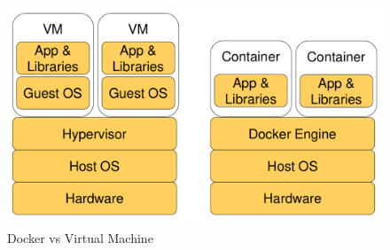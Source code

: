 \documentclass[twoside,english,brazilian]{UNISINOSartigo}
\begin{document}
\begin{figure}
	\caption{Docker vs Virtual Machine}
	\label{fig:vmvsdocker}
	\centering%
	\begin{minipage}{.3\textwidth}
		\includegraphics[width=\textwidth]{images/VMxDocker}
	\end{minipage}
\end{figure}
\end{document}
